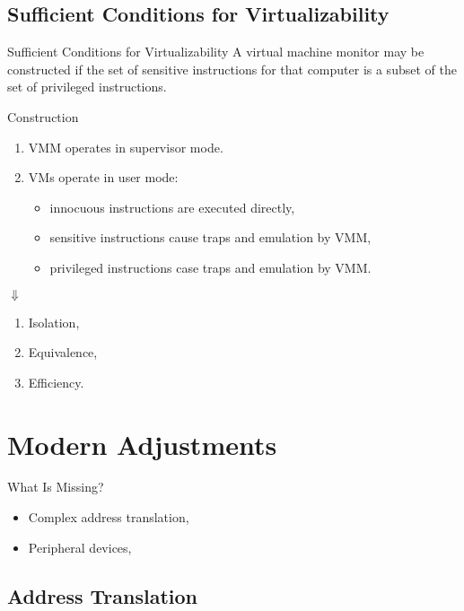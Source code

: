 \subsection{Sufficient Conditions for Virtualizability}

\begin{frame}{Sufficient Conditions for Virtualizability}
A virtual machine monitor may be constructed if the set of sensitive
instructions for that computer is a subset of the set of privileged
instructions.
\vfill\centering
{} 
\end{frame}

\begin{frame}{Construction}
\begin{enumerate}
\item VMM operates in supervisor mode.
\item VMs operate in user mode:
  \begin{itemize}
  \item innocuous instructions are executed directly,
  \item sensitive instructions cause traps and emulation by VMM,
  \item privileged instructions case traps and emulation by VMM.
  \end{itemize}
\end{enumerate}
\pause
\centering$\Downarrow$
\begin{enumerate}
  \item Isolation,
  \item Equivalence,
  \item Efficiency.
\end{enumerate}
\end{frame}

\section{Modern Adjustments}

\begin{frame}{What Is Missing?}
\begin{itemize}
  \item Complex address translation,
  \item Peripheral devices,
\end{itemize}
\end{frame}

\subsection{Address Translation}


